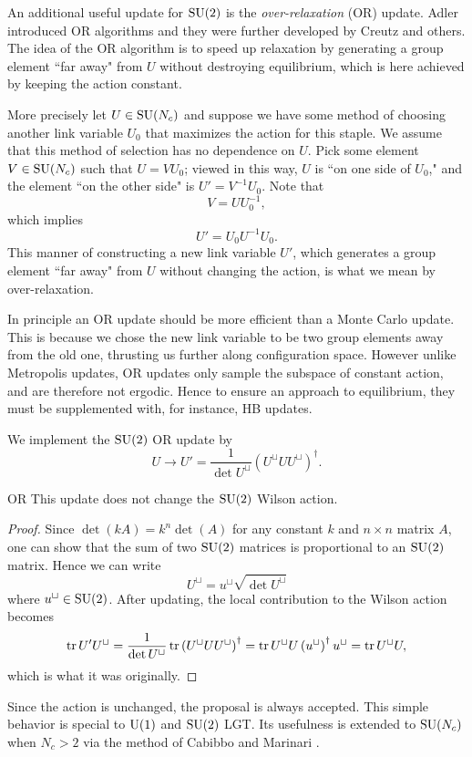 An additional useful update for $\operatorname{SU}(2)$ is the 
{\it over-relaxation} (OR) update. 
Adler introduced OR algorithms \cite{adler_over-relaxation_1981} and 
they were further developed by Creutz \cite{creutz_overrelaxation_1987} 
and others. The idea of the OR algorithm is to speed up relaxation 
by generating a group element ``far away" from $U$ without
destroying equilibrium, which is here achieved by keeping the action constant.

More precisely let $U\in\operatorname{SU}(N_c)$ and suppose we have some method of
choosing another link variable $U_0$ that maximizes
the action for this staple.  We assume that this method of selection has no
dependence on $U$.  Pick some element $V\in\operatorname{SU}(N_c)$ such that $U=VU_0$; viewed
in this way, $U$ is ``on one side of $U_0$," and the element 
``on the other side" is $U'=V^{-1}U_0$.  Note that
\begin{equation}
  V=U U_0^{-1},
\end{equation}
which implies
\begin{equation}
  U' = U_0 U^{-1} U_0.
\end{equation}
This manner of constructing a new link variable $U'$, which generates
a group element ``far away" from $U$ without changing the action, 
is what we mean by over-relaxation.

In principle an OR update should be more efficient than a Monte
Carlo update. This is because we chose the new link variable to be two
group elements away from the old one, thrusting us further
along configuration space. However unlike Metropolis updates, OR updates 
only sample the subspace of constant action, and are therefore not ergodic. 
Hence to ensure an approach to equilibrium, they must be supplemented with, 
for instance, HB updates.

We implement the $\operatorname{SU}(2)$ OR update by
\begin{equation}
  U\to U'=\frac{1}{\det U^\sqcup}\left(U^\sqcup UU^\sqcup\right)^\dagger.
\end{equation}
\begin{proposition}{}{OR}
  This update does not change the $\operatorname{SU}(2)$ Wilson action.
  \begin{proof}
   Since $\det(kA)=k^n\det(A)$ for any constant $k$ and $n\times n$ matrix $A$,
   one can show that the sum of two $\operatorname{SU}(2)$ matrices is proportional
   to an $\operatorname{SU}(2)$ matrix. Hence we can write
    $$
      U^\sqcup=u^\sqcup\sqrt{\det U^\sqcup}
    $$
    where $u^\sqcup\in\operatorname{SU}(2)$. After updating, the local contribution
    to the Wilson action becomes
    \begin{equation*}
      \tr U'U^\sqcup =\frac{1}{\det U^\sqcup}\tr
                       \left(U^\sqcup UU^\sqcup\right)^\dagger
                     =\tr U^\sqcup U\left(u^\sqcup\right)^\dagger u^\sqcup
                     =\tr U^\sqcup U,
    \end{equation*}
    which is what it was originally.
  \end{proof}
\end{proposition}
Since the action is unchanged, the proposal is always accepted. This simple 
behavior is special to $\operatorname{U}(1)$ and $\operatorname{SU}(2)$ LGT. Its usefulness is 
extended to $\operatorname{SU}(N_c)$ when $N_c>2$ via the method of Cabibbo and Marinari
\cite{cabibbo_new_1982}.

